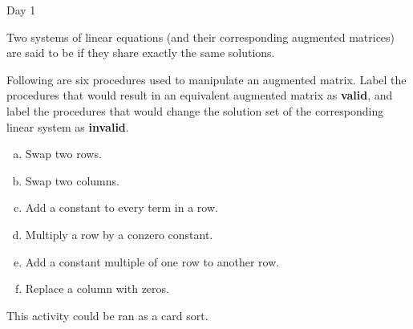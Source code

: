 \begin{applicationActivities}{Day 1}
\begin{definition}
  Two systems of linear equations (and their corresponding augmented
  matrices) are said to be  if they share exactly the
  same solutions.
\end{definition}

\begin{activity}{0}
  Following are six procedures used to manipulate an augmented matrix.
  Label the procedures that would result in an equivalent augmented
  matrix as \textbf{valid}, and label the procedures that would
  change the solution set of the corresponding linear system as
  \textbf{invalid}.
  \begin{multicols}{2}
    \begin{enumerate}[a)]
      \item Swap two rows.
      \item Swap two columns.
      \item Add a constant to every term in a row.
      \item Multiply a row by a conzero constant.
      \item Add a constant multiple of one row to another row.
      \item Replace a column with zeros.
    \end{enumerate}
  \end{multicols}
  \begin{TBLnote}
    This activity could be ran as a card sort.
  \end{TBLnote}
\end{activity}



\end{applicationActivities}
